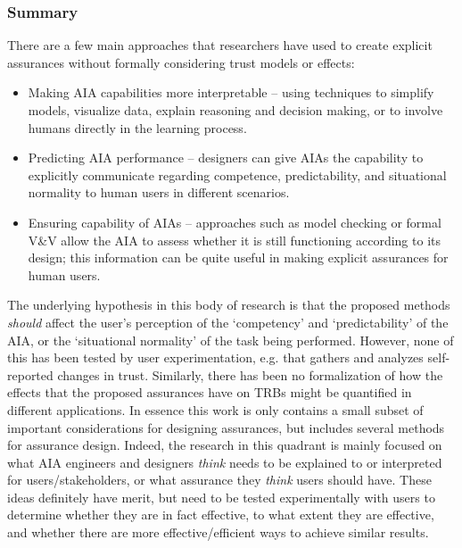 \subsubsection{Summary}
    There are a few main approaches that researchers have used to create explicit assurances without formally considering trust models or effects:
    \begin{itemize}
        \item Making AIA capabilities more interpretable -- using techniques to simplify models, visualize data, explain reasoning and decision making, or to involve humans directly in the learning process. %
        \item Predicting AIA performance -- %
				designers can give AIAs the capability to explicitly communicate regarding competence, predictability, and situational normality to human users in different scenarios. 
        \item Ensuring capability of AIAs -- approaches such as model checking or formal V\&V allow the AIA to assess whether it is still functioning according to its design; this information can be quite useful in making explicit assurances for human users.
    \end{itemize}

The underlying hypothesis in this body of research is that the proposed methods \emph{should} affect the user's perception of the `competency' and `predictability' of the AIA, or the `situational normality' of the task being performed. However, none of this has been tested by user experimentation, e.g. that gathers and analyzes self-reported changes in trust. Similarly, there has been no formalization of how the effects that the proposed assurances have on TRBs might be quantified in different applications. In essence this work is only contains a small subset of important considerations for designing assurances, but includes several methods for assurance design. 
Indeed, the research in this quadrant is mainly focused on what AIA engineers and designers \emph{think} needs to be explained to or interpreted for users/stakeholders, or what assurance they \emph{think} users should have. 
These ideas definitely have merit, but need to be tested experimentally with users to determine whether they are in fact effective, to what extent they are effective, and whether there are more effective/efficient ways to achieve similar results. 

